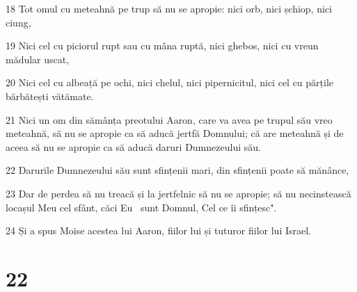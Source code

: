 \par 18 Tot omul cu meteahnă pe trup să nu se apropie: nici orb, nici șchiop, nici ciung,
\par 19 Nici cel cu piciorul rupt sau cu mâna ruptă, nici ghebos, nici cu vreun mădular uscat,
\par 20 Nici cel cu albeață pe ochi, nici chelul, nici pipernicitul, nici cel cu părțile bărbătești vătămate.
\par 21 Nici un om din sămânța preotului Aaron, care va avea pe trupul său vreo meteahnă, să nu se apropie ca să aducă jertfă Domnului; că are meteahnă și de aceea să nu se apropie ca să aducă daruri Dumnezeului său.
\par 22 Darurile Dumnezeului său sunt sfințenii mari, din sfințenii poate să mănânce,
\par 23 Dar de perdea să nu treacă și la jertfelnic să nu se apropie; să nu necinstească locașul Meu cel sfânt, căci Eu  sunt Domnul, Cel ce îi sfințesc".
\par 24 Și a spus Moise acestea lui Aaron, fiilor lui și tuturor fiilor lui Israel.

\chapter{22}

